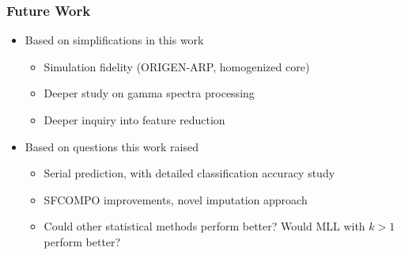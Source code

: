 \begin{frame}
  \frametitle{Future Work}
  \begin{itemize}
    \item Based on simplifications in this work
      \begin{itemize}
        \item Simulation fidelity (ORIGEN-ARP, homogenized core)
        \item Deeper study on gamma spectra processing
        \item Deeper inquiry into feature reduction
      \end{itemize}
    \item Based on questions this work raised
      \begin{itemize}
        \item Serial prediction, with detailed classification accuracy study 
        \item SFCOMPO improvements, novel imputation approach
        \item Could other statistical methods perform better? Would MLL with $k>1$ perform better?
      \end{itemize}
    \end{itemize}
\end{frame}

